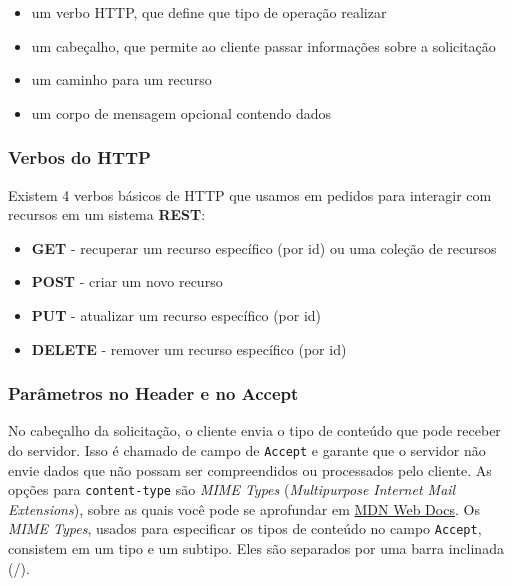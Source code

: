 \documentclass[12pt, a4paper
]{article}
\providecommand{\tightlist}{%
  \setlength{\itemsep}{0pt}\setlength{\parskip}{0pt}}
\begin{document}
\begin{itemize}
\tightlist
\item
  um verbo HTTP, que define que tipo de operação realizar
\item
  um cabeçalho, que permite ao cliente passar informações sobre a
  solicitação
\item
  um caminho para um recurso
\item
  um corpo de mensagem opcional contendo dados
\end{itemize}

\hypertarget{verbos-do-http}{%
\subsubsection{Verbos do HTTP}\label{verbos-do-http}}

Existem 4 verbos básicos de HTTP que usamos em pedidos para interagir
com recursos em um sistema \textbf{REST}:

\begin{itemize}
\tightlist
\item
  \textbf{GET} - recuperar um recurso específico (por id) ou uma coleção
  de recursos
\item
  \textbf{POST} - criar um novo recurso
\item
  \textbf{PUT} - atualizar um recurso específico (por id)
\item
  \textbf{DELETE} - remover um recurso específico (por id)
\end{itemize}

\hypertarget{paruxe2metros-no-header-e-no-accept}{%
\subsubsection{Parâmetros no Header e no
Accept}\label{paruxe2metros-no-header-e-no-accept}}

No cabeçalho da solicitação, o cliente envia o tipo de conteúdo que pode
receber do servidor. Isso é chamado de campo de \texttt{Accept} e
garante que o servidor não envie dados que não possam ser compreendidos
ou processados pelo cliente. As opções para \texttt{content-type} são
\emph{MIME Types} (\emph{Multipurpose Internet Mail Extensions}), sobre
as quais você pode se aprofundar em
\href{https://developer.mozilla.org/en-US/docs/Web/HTTP/Basics_of_HTTP/MIME_types}{MDN
Web Docs}. Os \emph{MIME Types}, usados para especificar os tipos de
conteúdo no campo \texttt{Accept}, consistem em um tipo e um subtipo.
Eles são separados por uma barra inclinada (/).
\end{document}
